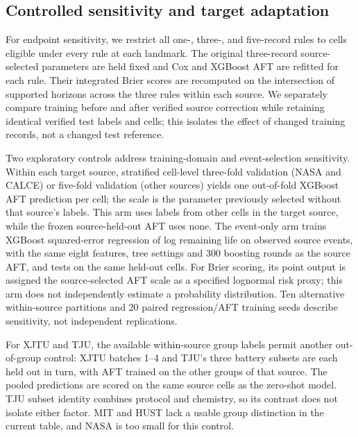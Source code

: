 \documentclass[preprint,12pt]{elsarticle}
\begin{document}
\subsection{Controlled sensitivity and target adaptation}
For endpoint sensitivity, we restrict all one-, three-, and five-record rules to cells eligible under every rule at each landmark. The original three-record source-selected parameters are held fixed and Cox and XGBoost AFT are refitted for each rule. Their integrated Brier scores are recomputed on the intersection of supported horizons across the three rules within each source. We separately compare training before and after verified source correction while retaining identical verified test labels and cells; this isolates the effect of changed training records, not a changed test reference.

Two exploratory controls address training-domain and event-selection sensitivity. Within each target source, stratified cell-level three-fold validation (NASA and CALCE) or five-fold validation (other sources) yields one out-of-fold XGBoost AFT prediction per cell; the scale is the parameter previously selected without that source's labels. This arm uses labels from other cells in the target source, while the frozen source-held-out AFT uses none. The event-only arm trains XGBoost squared-error regression of log remaining life on observed source events, with the same eight features, tree settings and 300 boosting rounds as the source AFT, and tests on the same held-out cells. For Brier scoring, its point output is assigned the source-selected AFT scale as a specified lognormal risk proxy; this arm does not independently estimate a probability distribution. Ten alternative within-source partitions and 20 paired regression/AFT training seeds describe sensitivity, not independent replications.

For XJTU and TJU, the available within-source group labels permit another out-of-group control: XJTU batches 1--4 and TJU's three battery subsets are each held out in turn, with AFT trained on the other groups of that source. The pooled predictions are scored on the same source cells as the zero-shot model. TJU subset identity combines protocol and chemistry, so its contrast does not isolate either factor. MIT and HUST lack a usable group distinction in the current table, and NASA is too small for this control.
\end{document}
